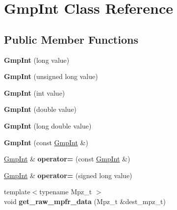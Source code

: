 \hypertarget{class_gmp_int}{}\section{Gmp\+Int Class Reference}
\label{class_gmp_int}
\subsection*{Public Member Functions}
\begin{DoxyCompactItemize}
\item 
\mbox{\label{class_gmp_int_aa8353e2c9bef1fc1592409a57934f6a2}} 
{\bfseries Gmp\+Int} (long value)
\item 
\mbox{\label{class_gmp_int_a5d22f4edbf9bd4e98f061860503ce395}} 
{\bfseries Gmp\+Int} (unsigned long value)
\item 
\mbox{\label{class_gmp_int_a2aed4720584b68430b49a221829b6b77}} 
{\bfseries Gmp\+Int} (int value)
\item 
\mbox{\label{class_gmp_int_a57fe7d80c8af394b9fc6611ca274b6af}} 
{\bfseries Gmp\+Int} (double value)
\item 
\mbox{\label{class_gmp_int_a1a13efaf5cd6fb68886c1a87579339cc}} 
{\bfseries Gmp\+Int} (long double value)
\item 
\mbox{\label{class_gmp_int_a4634cc1306298b1b60b973a29c20429c}} 
{\bfseries Gmp\+Int} (const \hyperlink{class_gmp_int}{Gmp\+Int} \&)
\item 
\mbox{\label{class_gmp_int_aaa554c660aa3bbe03c6f4e0de0b7ffac}} 
\hyperlink{class_gmp_int}{Gmp\+Int} \& {\bfseries operator=} (const \hyperlink{class_gmp_int}{Gmp\+Int} \&)
\item 
\mbox{\label{class_gmp_int_a43f34a5c89918f74c04990587004ef5e}} 
\hyperlink{class_gmp_int}{Gmp\+Int} \& {\bfseries operator=} (signed long value)
\item 
\mbox{\label{class_gmp_int_ad971f7fa8334e8802e4e29d3bed73781}} 
{\footnotesize template$<$typename Mpz\+\_\+t $>$ }\\void {\bfseries get\+\_\+raw\+\_\+mpfr\+\_\+data} (Mpz\+\_\+t \&dest\+\_\+mpz\+\_\+t)

\end{DoxyCompactItemize}
